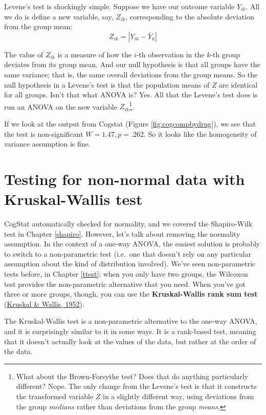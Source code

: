 \documentclass[
]{book}
\theoremstyle{definition}
\theoremstyle{definition}
\theoremstyle{definition}
\theoremstyle{definition}
\theoremstyle{remark}
\begin{document}
Levene's test is shockingly simple. Suppose we have our outcome variable \(Y_{ik}\). All we do is define a new variable, say, \(Z_{ik}\), corresponding to the absolute deviation from the group mean:
\[
Z_{ik} = \left| Y_{ik} - \bar{Y}_k \right|
\]

The value of \(Z_{ik}\) is a measure of how the \(i\)-th observation in the \(k\)-th group deviates from its group mean. And our null hypothesis is that all groups have the same variance; that is, the same overall deviations from the group means. So the null hypothesis in a Levene's test is that the population means of \(Z\) are identical for all groups. Isn't that what ANOVA is? Yes. All that the Levene's test does is run an ANOVA on the new variable \(Z_{ik}\)\footnote{What about the Brown-Forsythe test? Does that do anything particularly different? Nope. The only change from the Levene's test is that it constructs the transformed variable \(Z\) in a slightly different way, using deviations from the group \emph{medians} rather than deviations from the group \emph{means}.}.

If we look at the output from Cogstat (Figure \ref{fig:cogcompbydrug}), we see that the test is non-significant \(W = 1.47, p = .262\). So it looks like the homogeneity of variance assumption is fine.

\hypertarget{kruskalwallis}{%
\section{Testing for non-normal data with Kruskal-Wallis test}\label{kruskalwallis}}

CogStat automatically checked for normality, and we covered the Shapiro-Wilk test in Chapter \ref{shapiro}. However, let's talk about removing the normality assumption. In the context of a one-way ANOVA, the easiest solution is probably to switch to a non-parametric test (i.e.~one that doesn't rely on any particular assumption about the kind of distribution involved). We've seen non-parametric tests before, in Chapter \ref{ttest}: when you only have two groups, the Wilcoxon test provides the non-parametric alternative that you need. When you've got three or more groups, though, you can use the \textbf{Kruskal-Wallis rank sum test} (\protect\hyperlink{ref-KruskalWallis1952}{Kruskal \& Wallis, 1952}).

The Kruskal-Wallis test is a non-parametric alternative to the one-way ANOVA, and it is surprisingly similar to it in some ways. It is a rank-based test, meaning that it doesn't actually look at the values of the data, but rather at the order of the data.
\end{document}

